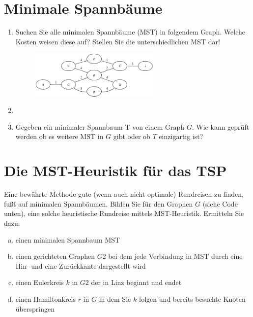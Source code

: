 \documentclass[a4paper,11pt]{report}
\begin{document}
    \chapter{Minimale Spannbäume}
    \label{ch:minSb}
    \begin{enumerate}
        \item Suchen Sie alle minimalen Spannbäume (MST) in folgendem Graph.
        Welche Kosten weisen diese auf?
        Stellen Sie die unterschiedlichen MST dar!

        \begin{figure}[H]
            \centering
            \includegraphics[width=0.6\textwidth]{a03a_graph}
            \label{fig:a03_graph}
        \end{figure}
        \item
        \item Gegeben ein minimaler Spannbaum T von einem Graph $G$.
        Wie kann geprüft werden ob es weitere MST in $G$ gibt oder ob $T$ einzigartig ist?
    \end{enumerate}

    \newpage

    \chapter{Die MST-Heuristik für das TSP}
    \label{ch:mstHeuristicTSP}
    Eine bewährte Methode gute (wenn auch nicht optimale) Rundreisen zu finden, fußt auf minimalen Spannbäumen.
    Bilden Sie für den Graphen $G$ (siehe Code unten), eine solche heuristische Rundreise mittels MST-Heuristik.
    Ermitteln Sie dazu:

    \begin{enumerate}[a)]
        \item einen minimalen Spannbaum MST
        \item einen gerichteten Graphen $G2$ bei dem jede Verbindung in MST durch eine Hin- und
        eine Zurückkante dargestellt wird
        \item einen Eulerkreis $k$ in $G2$ der in Linz beginnt und endet
        \item einen Hamiltonkreis $r$ in $G$ in dem Sie $k$ folgen und bereits besuchte Knoten
        überspringen
    \end{enumerate}
\end{document}
